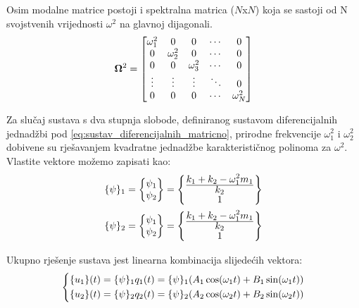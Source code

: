 Osim modalne matrice postoji i spektralna matrica ($N$x$N$) koja se sastoji od N
svojstvenih vrijednosti $\omega^2$ na glavnoj dijagonali.
\[
	\mathbf{\Omega}^2 
	= 
	\begin{bmatrix}
		\omega_1^2 & 0 & 0 & \cdots & 0 \\
		0 & \omega_2^2 & 0 & \cdots & 0 \\
		0 & 0 & \omega_3^2 & \cdots & 0 \\
		\vdots  & \vdots  & \vdots  & \ddots &  0 \\
		0 & 0 & 0 & \cdots &  \omega_N^2 
	\end{bmatrix}
\]


Za slučaj sustava s dva stupnja slobode, definiranog sustavom diferencijalnih
jednadžbi pod \eqref{eq:sustav_diferencijalnih_matricno}, prirodne frekvencije 
$\omega_1^2$ i $\omega_2^2$ dobivene su rješavanjem kvadratne jednadžbe karakterističnog
polinoma za $\omega^2$. Vlastite vektore možemo zapisati kao:
\begin{align}
    \vtor{\psi}{}_1=
    \begin{Bmatrix}
        \psi_1\\
        \psi_2
    \end{Bmatrix}
    &=
    \begin{Bmatrix}
        \ffrac{k_1+k_2-\omega_1^2m_1}{k_2}\\
        1
    \end{Bmatrix}\\
    \vtor{\psi}{}_2=
    \begin{Bmatrix}
        \psi_1\\
        \psi_2
    \end{Bmatrix}
    &=
    \begin{Bmatrix}
        \ffrac{k_1+k_2-\omega_1^2m_1}{k_2}\\
        1
    \end{Bmatrix}
\end{align}

Ukupno rješenje sustava jest linearna kombinacija slijedećih vektora:
\begin{equation}
    \begin{dcases}
        \vtor{u_1}{}(t) = \vtor{\psi}{}_1 q_1(t) = \vtor{\psi}{}_1 (A_1\cos(\omega_1 t) + B_1\sin(\omega_1 t))\\
        \vtor{u_2}{}(t) = \vtor{\psi}{}_2 q_2(t) = \vtor{\psi}{}_2 (A_2\cos(\omega_2 t) + B_2\sin(\omega_2 t))
    \end{dcases}
\end{equation}

